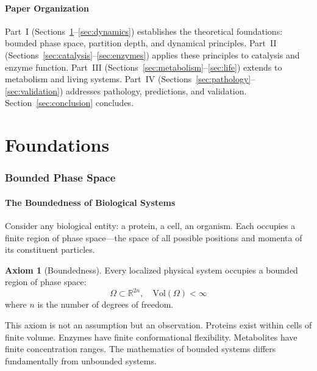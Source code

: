\documentclass[twocolumn,10pt,a4paper]{article}
\theoremstyle{definition}
\newtheorem{axiom}{Axiom}
\theoremstyle{remark}
\begin{document}
\subsection{Paper Organization}

Part~I (Sections~\ref{sec:foundations}--\ref{sec:dynamics}) establishes the theoretical foundations: bounded phase space, partition depth, and dynamical principles. Part~II (Sections~\ref{sec:catalysis}--\ref{sec:enzymes}) applies these principles to catalysis and enzyme function. Part~III (Sections~\ref{sec:metabolism}--\ref{sec:life}) extends to metabolism and living systems. Part~IV (Sections~\ref{sec:pathology}--\ref{sec:validation}) addresses pathology, predictions, and validation. Section~\ref{sec:conclusion} concludes.

\part{Foundations}

\section{Bounded Phase Space}
\label{sec:foundations}

\subsection{The Boundedness of Biological Systems}

Consider any biological entity: a protein, a cell, an organism. Each occupies a finite region of phase space---the space of all possible positions and momenta of its constituent particles.

\begin{axiom}[Boundedness]
\label{ax:bounded}
Every localized physical system occupies a bounded region of phase space:
\begin{equation}
    \Omega \subset \mathbb{R}^{2n}, \quad \mathrm{Vol}(\Omega) < \infty
\end{equation}
where $n$ is the number of degrees of freedom.
\end{axiom}

This axiom is not an assumption but an observation. Proteins exist within cells of finite volume. Enzymes have finite conformational flexibility. Metabolites have finite concentration ranges. The mathematics of bounded systems differs fundamentally from unbounded systems.
\end{document}

